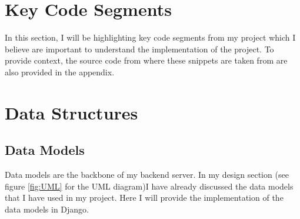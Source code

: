\section{Key Code Segments}
In this section, I will be highlighting key code segments from my project which I believe are important to understand the implementation of the project. To provide context, the source code from where these snippets are taken from are also provided in the appendix.


\section{Data Structures}

\subsection{Data Models}
Data models are the backbone of my backend server. In my design section (see figure \ref{fig:UML} for the UML diagram)I have already discussed the data models that I have used in my project. Here I will provide the implementation of the data models in Django.

